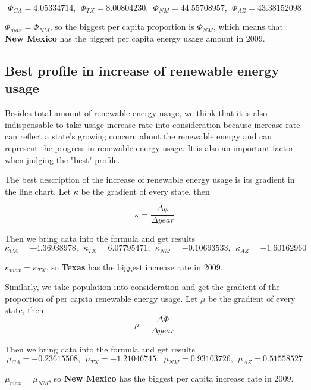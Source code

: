 \documentclass[a4paper,11pt]{article}
\begin{document}
\begin{equation}
    \Phi_{CA} = 4.05334714,~~ \Phi_{TX} = 8.00804230,~~ \Phi_{NM} = 44.55708957,~~ \Phi_{AZ} = 43.38152098
\end{equation}
\par $\Phi_{max} = \Phi_{NM}$, so the biggest per capita proportion is $\Phi_{NM}$, which means that \textbf{New Mexico} has the biggest per capita energy usage amount in 2009.

\subsection{Best profile in increase of renewable energy usage}

\par Besides total amount of renewable energy usage, we think that it is also indispensable to take usage increase rate into consideration because increase rate can reflect a state's growing concern about the renewable energy and can represent the progress in renewable energy usage. It is also an important factor when judging the "best" profile.

\par The best description of the increase of renewable energy usage is its gradient in the line chart. Let $\kappa$ be the gradient of every state, then 

\begin{equation}
    \kappa = \frac{\Delta \phi}{\Delta year}
\end{equation}

\par Then we bring data into the formula and get results
\begin{equation}
    \kappa_{CA} = -4.36938978,~~ \kappa_{TX} = 6.07795471,~~ \kappa_{NM} = -0.10693533,~~ \kappa_{AZ} = -1.60162960
\end{equation}
\par $\kappa_{max} = \kappa_{TX}$, so \textbf{Texas} has the biggest increase rate in 2009.

\par Similarly, we take population into consideration and get the gradient of the proportion of per capita renewable energy usage. Let $\mu$ be the gradient of every state, then 
\begin{equation}
    \mu = \frac{\Delta \Phi}{\Delta year}
\end{equation}

\par Then we bring data into the formula and get results
\begin{equation}
    \mu_{CA} = -0.23615508,~~ \mu_{TX} = -1.21046745,~~ \mu_{NM} = 0.93103726,~~ \mu_{AZ} = 0.51558527
\end{equation}
\par $\mu_{max} = \mu_{NM}$, so \textbf{New Mexico} has the biggest per capita increase rate in 2009.
\end{document}
